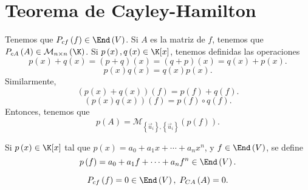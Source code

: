 \section{Teorema de Cayley-Hamilton}
Tenemos que $\displaystyle P_{cf}\left(f\right) \in \End\left(V\right)$. Si $\displaystyle A $ es la matriz de $\displaystyle f $, tenemos que $\displaystyle P_{cA}\left(A\right) \in \mathcal{M}_{n \times n}\left(\K\right) $. Si $\displaystyle p\left(x\right), q\left(x\right) \in \K[x] $, tenemos definidas las operaciones
\[p\left(x\right) + q\left(x\right) = \left(p + q\right)\left(x\right) = \left(q + p\right)\left(x\right) = q\left(x\right) + p\left(x\right) .\]
\[p\left(x\right)q\left(x\right) = q\left(x\right) p\left(x\right) .\]
Similarmente, 
\[\left(p\left(x\right)+q\left(x\right)\right)\left(f\right) = p\left(f\right) + q\left(f\right) .\]
\[\left(p\left(x\right)q\left(x\right)\right)\left(f\right) = p\left(f\right)\circ q\left(f\right) .\]
Entonces, tenemos que
\[p\left(A\right) = \mathcal{M}_{ \left\{ \vec{u}_{i}\right\} , \left\{ \vec{u}_{i}\right\} }\left(p\left(f\right)\right) .\]
\begin{observation}
	\normalfont Si $\displaystyle p\left(x\right) \in \K[x] $ tal que $\displaystyle p\left(x\right) = a_{0} + a_{1}x + \cdots + a_{n}x^{n} $, y $\displaystyle f \in \End\left(V\right)$, se define 
	\[p\left(f\right) = a_{0} + a_{1}f + \cdots + a_{n}f^{n} \in \End\left(V\right) .\]
\end{observation}
\begin{ftheorem}
\normalfont 
\[P_{cf}\left(f\right) = 0 \in \End\left(V\right), \; P_{CA}\left(A\right) = 0 .\]
\end{ftheorem}
